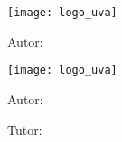 \documentclass{subfiles}
\begin{document}

  \begin{titlepage}

    \centering
    \texttt{[image: logo\_uva]}\par\vspace{1cm}

    {\scshape\Huge \theschool \par}
    \vspace{0.5cm}

    {\scshape\Large \thesubject\par}
    \vspace{1.25cm}

    {\scshape\Large \thegrade\par}
    \vspace{4cm}

    {\Huge\textbf{\thetitle}\par}
    \vspace{2cm}


    {\Large\hfill Autor: \par}
    {\Large\hfill\bfseries \theauthor\par}
    \vfill

  \end{titlepage}

  \clearpage\mbox{}\thispagestyle{empty}\clearpage

  \begin{titlepage}

    \centering
    \texttt{[image: logo\_uva]}\par\vspace{1cm}

    {\scshape\Huge \theschool \par}
    \vspace{0.5cm}

    {\scshape\Large \thesubject\par}
    \vspace{1.25cm}

    {\scshape\Large \thegrade\par}
    \vspace{4cm}

    {\Huge\textbf{\thetitle}\par}
    \vspace{2cm}


    {\Large\hfill Autor: \par}
    {\Large\hfill\bfseries \theauthor\par}
    \vspace{0.5cm}

    {\Large\hfill Tutor: \par}
    {\Large\hfill\bfseries \thesupervisorfirst\par}
    {\Large\hfill\bfseries \thesupervisorsecond\par}
    \vfill

  \end{titlepage}

  \clearpage\mbox{}\thispagestyle{empty}\clearpage

  \restoregeometry
  \setcounter{page}{1}
\end{document}
